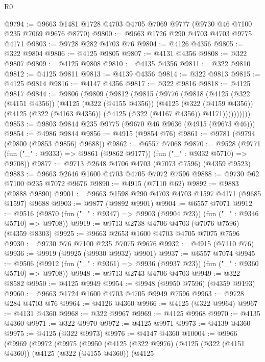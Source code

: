 \begin{lexlean}{R0}
\begin{coremodule}
@9794 := @9663 @1481 @1728 @4703 @4705 @7069 @9777 (@9730 @46 @7100 @235 @7069 @9676 @8770)
@9800 := @9663 @1726 @290 @4703 @4703 @9775 @4171
@9803 := @9728 @282 @4703 @76
@9804 := @4126 @4356
@9805 := @322 @9804
@9806 := @4125 @9805
@9807 := @4131 @4356
@9808 := @322 @9807
@9809 := @4125 @9808
@9810 := @4135 @4356
@9811 := @322 @9810
@9812 := @4125 @9811
@9813 := @4139 @4356
@9814 := @322 @9813
@9815 := @4125 @9814
@9816 := @4147 @4356
@9817 := @322 @9816
@9818 := @4125 @9817
@9844 := @9806
    (@9809
      (@9812
        (@9815
          (@9776
            (@9818
              (@4125
                (@322 (@4151 @4356))
                (@4125
                  (@322 (@4155 @4356))
                  (@4125
                    (@322 (@4159 @4356))
                    (@4125 (@322 (@4163 @4356)) (@4125 (@322 (@4167 @4356)) @4171))))))))))
@9853 := @9803 @9844 @235 @9775 (@9670 @46 @9636 (@4915 (@9673 @46)))
@9854 := @4986 @9844
@9856 := @4915 (@9854 @76)
@9861 := @9781 (@9794 (@9800 (@9853 @9856) @9688))
@9862 := @6557 @7068
@9870 := @9528 (@9771 (fun ("_" : @9333) => @9861 (@9862 @9177)) (fun ("_" : @9332 @5710) => @9708))
@9877 := @9713 @2648 @4706 @4703 (@7073 @7596) (@4359 @9523)
@9883 := @9663 @2646 @1600 @4703 @4705 @7072 @7596
@9888 := @9730 @62 @7100 @235 @7072 @9676
@9890 := @4915 (@7110 @62)
@9892 := @9883 (@9888 @9890)
@9901 := @9663 @1598 @290 @4703 @4703 @1597 @4171 (@9685 @1597) @9688
@9903 := @9877 (@9892 @9901)
@9904 := @6557 @7071
@9912 := @9516 (@9870 (fun ("_" : @9347) => @9903 (@9904 @23)) (fun ("_" : @9346 @5710) => @9708))
@9919 := @9713 @2738 @4706 @4703 (@7076 @7596) (@4359 @8303)
@9925 := @9663 @2653 @1600 @4703 @4705 @7075 @7596
@9930 := @9730 @76 @7100 @235 @7075 @9676
@9932 := @4915 (@7110 @76)
@9936 := @9919 (@9925 (@9930 @9932) @9901)
@9937 := @6557 @7074
@9945 := @9506 (@9912 (fun ("_" : @9361) => @9936 (@9937 @23)) (fun ("_" : @9360 @5710) => @9708))
@9948 := @9713 @2743 @4706 @4703
@9949 := @322 @8582
@9950 := @4125 @9949
@9954 := @9948 (@9950 @7596) (@4359 @9193)
@9960 := @9663 @1724 @1600 @4703 @4705 @9949 @7596
@9963 := @9728 @284 @4703 @76
@9964 := @4126 @4360
@9966 := @4125 (@322 @9964)
@9967 := @4131 @4360
@9968 := @322 @9967
@9969 := @4125 @9968
@9970 := @4135 @4360
@9971 := @322 @9970
@9972 := @4125 @9971
@9973 := @4139 @4360
@9975 := @4125 (@322 @9973)
@9976 := @4147 @4360
@10004 := @9966
    (@9969
      (@9972
        (@9975
          (@9950
            (@4125
              (@322 @9976)
              (@4125
                (@322 (@4151 @4360))
                (@4125
                  (@322 (@4155 @4360))
                  (@4125

\end{coremodule}
\end{lexlean}
